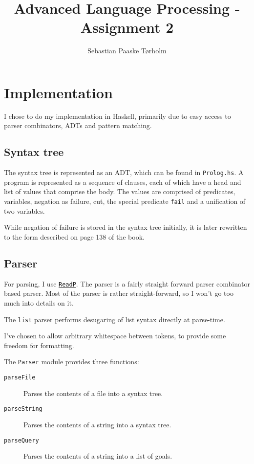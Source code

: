 \documentclass[11pt,a4paper]{article}
\title{Advanced Language Processing - Assignment 2}
\author{Sebastian Paaske Tørholm}
\newcommand{\hoogle}[1]{\href{http://www.haskell.org/hoogle/?hoogle=#1}{\texttt{#1}}}
\begin{document}
\maketitle

\section{Implementation}

I chose to do my implementation in Haskell, primarily due to easy access to
parser combinators, ADTs and pattern matching.

\subsection{Syntax tree}

The syntax tree is represented as an ADT, which can be found in
\texttt{Prolog.hs}. A program is represented as a sequence of clauses, each
of which have a head and list of values that comprise the body. The values
are comprised of predicates, variables, negation as failure, cut, the special
predicate \texttt{fail} and a unification of two variables.

While negation of failure is stored in the syntax tree initially, it is later
rewritten to the form described on page 138 of the book.

\subsection{Parser}

For parsing, I use \hoogle{ReadP}. The parser is a fairly straight forward
parser combinator based parser. Most of the parser is rather straight-forward,
so I won't go too much into details on it.

The \texttt{list} parser performs desugaring of list syntax directly at
parse-time.

I've chosen to allow arbitrary whitespace between tokens, to provide some freedom for formatting.

The \texttt{Parser} module provides three functions: 

\begin{description}
    \item[\texttt{parseFile}] Parses the contents of a file into a syntax tree.
    \item[\texttt{parseString}] Parses the contents of a string into a syntax tree.
    \item[\texttt{parseQuery}] Parses the contents of a string into a list of goals.
\end{description}
\end{document}
